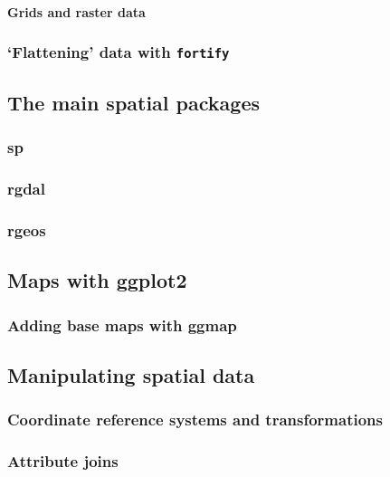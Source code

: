 \documentclass[]{article}
\begin{document}
\paragraph{Grids and raster data}

\subsubsection{`Flattening' data with \texttt{fortify}}

\subsection{The main spatial packages}

\subsubsection{sp}

\subsubsection{rgdal}

\subsubsection{rgeos}

\subsection{Maps with ggplot2}

\subsubsection{Adding base maps with ggmap}

\subsection{Manipulating spatial data}

\subsubsection{Coordinate reference systems and transformations}

\subsubsection{Attribute joins}
\end{document}
